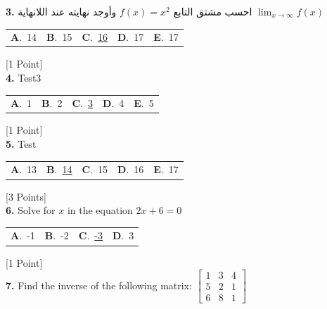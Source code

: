 \documentclass[12pt]{article}
\newcommand{\choice}[2]{\textbf{#1}.~#2}
\begin{document}
\noindent \textbf{\textenglish{3.}} {\textarabic{احسب مشتق التابع }}\( f(x) = x^2\){\textarabic{ وأوجد نهايته عند اللانهاية }}\(\lim_{x \to \infty}f(x)\)

\begin{tabularx}{\linewidth}{@{}*{5}{Y}@{}}
\choice{A}{{{\textenglish{14}}}} & \choice{B}{{{\textenglish{15}}}} & \choice{C}{{\underline{{\textenglish{16}}}}} & \choice{D}{{{\textenglish{17}}}} & \choice{E}{{{\textenglish{17}}}} \\
\end{tabularx}
\hfill {\textenglish{[1 Point]}}\\[0.5em]

\noindent \textbf{\textenglish{4.}} {\textenglish{Test3}}

\begin{tabularx}{\linewidth}{@{}*{5}{Y}@{}}
\choice{A}{{{\textenglish{1}}}} & \choice{B}{{{\textenglish{2}}}} & \choice{C}{{\underline{{\textenglish{3}}}}} & \choice{D}{{{\textenglish{4}}}} & \choice{E}{{{\textenglish{5}}}} \\
\end{tabularx}
\hfill {\textenglish{[1 Point]}}\\[0.5em]

\noindent \textbf{\textenglish{5.}} {\textenglish{Test}}

\begin{tabularx}{\linewidth}{@{}*{5}{Y}@{}}
\choice{A}{{{\textenglish{13}}}} & \choice{B}{{\underline{{\textenglish{14}}}}} & \choice{C}{{{\textenglish{15}}}} & \choice{D}{{{\textenglish{16}}}} & \choice{E}{{{\textenglish{17}}}} \\
\end{tabularx}
\hfill {\textenglish{[3 Points]}}\\[0.5em]

\noindent \textbf{\textenglish{6.}} {\textenglish{Solve for }}\(x \){\textenglish{ in the equation }}\(2x+6 = 0 \)

\begin{tabularx}{\linewidth}{@{}*{4}{Y}@{}}
\choice{A}{{{\textenglish{-1}}}} & \choice{B}{{{\textenglish{-2}}}} & \choice{C}{{\underline{{\textenglish{-3}}}}} & \choice{D}{{{\textenglish{3}}}} \\
\end{tabularx}
\hfill {\textenglish{[1 Point]}}\\[0.5em]

\noindent \textbf{\textenglish{7.}} {\textenglish{Find the inverse of the following matrix: }}\(\begin{bmatrix} 1 & 3 & 4 \\ 5 & 2 & 1 \\ 6 & 8 & 1 \end{bmatrix}\)
\end{document}
